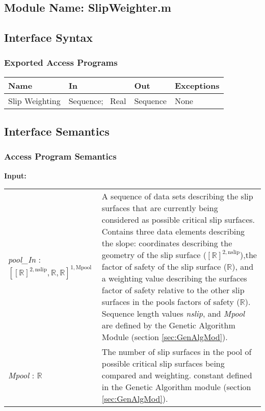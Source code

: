 \documentclass[12pt, titlepage]{article}
\begin{document}
\subsection{Module Name: SlipWeighter.m}

\subsection{Interface Syntax}

\subsubsection{Exported Access Programs}
\begin{center}
\renewcommand*{\arraystretch}{1.5}
\begin{tabular}{| p{} | p{} | 
p{} | p{} |} \hline 

  \textbf{Name} & \textbf{In} & \textbf{Out} & \textbf{Exceptions}
  \\ \hline

  Slip Weighting & Sequence; ~\newline Real & Sequence & None
  \\ \hline
\end{tabular}
\end{center}

\subsection{Interface Semantics}

\subsubsection{Access Program Semantics}
\textbf{Input:} 
\renewcommand*{\arraystretch}{1.5}
\begin{longtable}{p{} p{}}
  \textit{pool\_In} : $[[\mathbb{R}]^{2,\text{nslip}}, \mathbb{R},
    \mathbb{R}]^{1,\text{Mpool}}$ & A sequence of data sets describing
  the slip surfaces that are currently being considered as possible
  critical slip surfaces. Contains three data elements describing the
  slope: coordinates describing the geometry of the slip surface
  ($[\mathbb{R}]^{2,\text{nslip}}$),the factor of safety of the slip
  surface ($\mathbb{R}$), and a weighting value describing the
  surfaces factor of safety relative to the other slip surfaces in the
  pools factors of safety ($\mathbb{R}$). Sequence length values
  \textit{nslip}, and \textit{Mpool} are defined by the Genetic
  Algorithm Module (section \ref{sec:GenAlgMod}). \\

  \textit{Mpool} : $\mathbb{R}$ & The number of slip surfaces in the
  pool of possible critical slip surfaces being compared and
  weighting. constant defined in the Genetic Algorithm module (section
  \ref{sec:GenAlgMod}).
\end{longtable}
\end{document}
